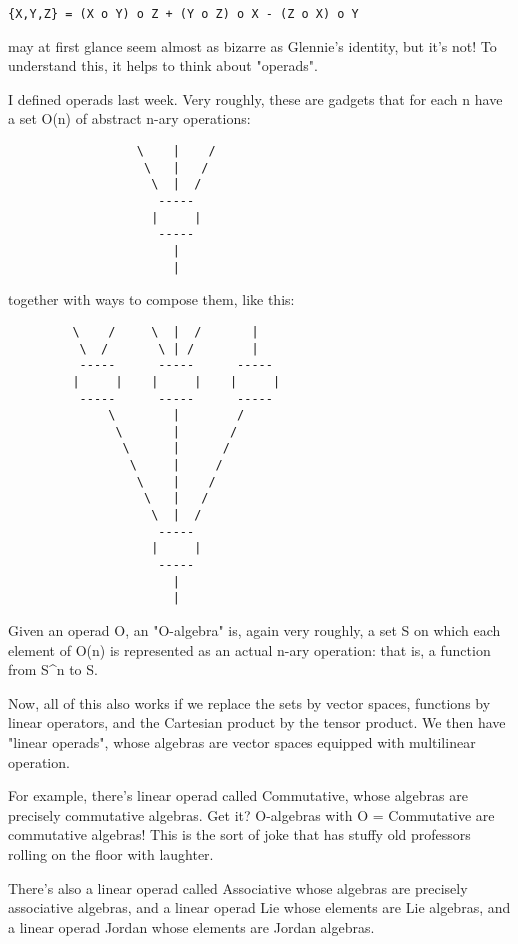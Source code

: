 \begin{verbatim}
{X,Y,Z} = (X o Y) o Z + (Y o Z) o X - (Z o X) o Y
\end{verbatim}
    
may at first glance seem almost as bizarre as Glennie's identity,
but it's not!  To understand this, it helps to think about "operads".

I defined operads last week.  Very roughly, these are gadgets 
that for each n have a set O(n) of abstract n-ary operations:


\begin{verbatim}
                  \    |    /
                   \   |   / 
                    \  |  /
                     -----
                    |     | 
                     -----
                       |
                       |
\end{verbatim}
    
together with ways to compose them, like this:


\begin{verbatim}
         \    /     \  |  /       | 
          \  /       \ | /        |
          -----      -----      -----
         |     |    |     |    |     |
          -----      -----      -----
              \        |        /  
               \       |       /
                \      |      /
                 \     |     /
                  \    |    / 
                   \   |   /  
                    \  |  /
                     -----
                    |     | 
                     -----
                       |
                       |
\end{verbatim}
    
Given an operad O, an "O-algebra" is, again very roughly, a set S on
which each element of O(n) is represented as an actual n-ary operation:
that is, a function from S^{n} to S.

Now, all of this also works if we replace the sets by vector spaces,
functions by linear operators, and the Cartesian product by the tensor
product.  We then have "linear operads", whose algebras are vector
spaces equipped with multilinear operation.

For example, there's linear operad called Commutative, whose algebras
are precisely commutative algebras.  Get it?  O-algebras with O = 
Commutative are commutative algebras!  This is the sort of joke that 
has stuffy old professors rolling on the floor with laughter.

There's also a linear operad called Associative whose algebras are 
precisely associative algebras, and a linear operad Lie whose elements 
are Lie algebras, and a linear operad Jordan whose elements are Jordan 
algebras.  


